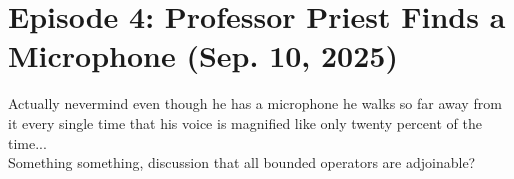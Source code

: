 \section{Episode 4: Professor Priest Finds a Microphone (Sep. 10, 2025)}
Actually nevermind even though he has a microphone he walks so far away from it every single time that his voice is magnified like only twenty percent of the time...
\\[8pt]
Something something, discussion that all bounded operators are adjoinable?